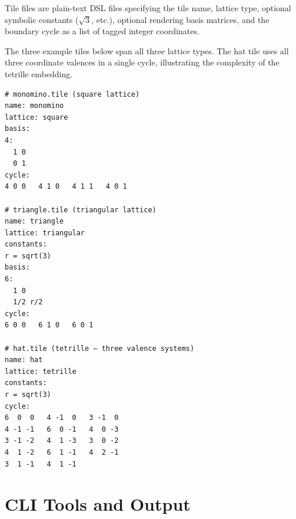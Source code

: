 \documentclass[10pt,a4paper]{article}
\newcommand{\file}[1]{\texttt{\footnotesize #1}}
\begin{document}
\begin{tcolorbox}[dualbox, title=Tile DSL — \file{tiles/*.tile}]
  Tile files are plain-text DSL files specifying the tile name,
  lattice type, optional symbolic constants ($\sqrt{3}$, etc.),
  optional rendering basis matrices, and the boundary cycle as a list
  of tagged integer coordinates.

  The three example tiles below span all three lattice types.
  The hat tile uses all three coordinate valences in a single cycle,
  illustrating the complexity of the tetrille embedding.
\tcblower
\begin{verbatim}
# monomino.tile (square lattice)
name: monomino
lattice: square
basis:
4:
  1 0
  0 1
cycle:
4 0 0   4 1 0   4 1 1   4 0 1

# triangle.tile (triangular lattice)
name: triangle
lattice: triangular
constants:
r = sqrt(3)
basis:
6:
  1 0
  1/2 r/2
cycle:
6 0 0   6 1 0   6 0 1

# hat.tile (tetrille — three valence systems)
name: hat
lattice: tetrille
constants:
r = sqrt(3)
cycle:
6  0  0   4 -1  0   3 -1  0
4 -1 -1   6  0 -1   4  0 -3
3 -1 -2   4  1 -3   3  0 -2
4  1 -2   6  1 -1   4  2 -1
3  1 -1   4  1 -1
\end{verbatim}
\end{tcolorbox}

\section{CLI Tools and Output}
\end{document}
